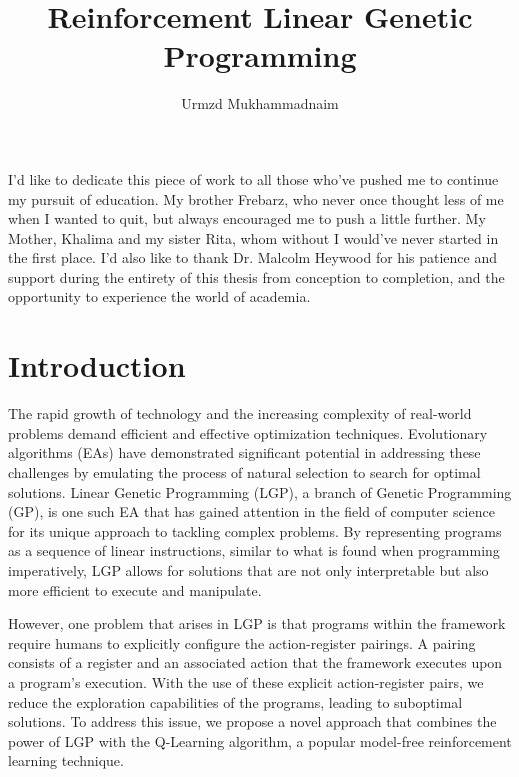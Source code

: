 \documentclass[12pt, final]{dalcsthesis}
\begin{document}
\bcshon
\title{Reinforcement Linear Genetic Programming}
\author{Urmzd Mukhammadnaim}

\reader{}

\nolistoftables
\nolistoffigures

\frontmatter

\nocite{*}

\begin{abstract}
\end{abstract}

\begin{acknowledgements}
    I'd like to dedicate this piece of work to all those who've pushed me to continue my
    pursuit of education. My brother Frebarz, who never once thought less of me when I wanted to 
    quit, but always encouraged me to push a little further. My Mother, Khalima and my sister Rita, whom without I would've never started in the first place. I'd also like to thank Dr. Malcolm Heywood for 
    his patience and support during the entirety of this thesis from conception to completion, and the opportunity to experience the world of academia.
\end{acknowledgements}

\mainmatter

\chapter{Introduction}
The rapid growth of technology and the increasing complexity of real-world problems demand efficient and effective optimization techniques. Evolutionary algorithms (EAs) have demonstrated significant potential in addressing these challenges by emulating the process of natural selection to search for optimal solutions. Linear Genetic Programming (LGP), a branch of Genetic Programming (GP), is one such EA that has gained attention in the field of computer science for its unique approach to tackling complex problems. By representing programs as a sequence of linear instructions, similar to what is found when programming imperatively, LGP allows for solutions that are not only interpretable but also more efficient to execute and manipulate.

However, one problem that arises in LGP is that programs within the framework require humans to explicitly configure the action-register pairings. A pairing consists of a register and an associated action that the framework executes upon a program's execution. With the use of these explicit action-register pairs, we reduce the exploration capabilities of the programs, leading to suboptimal solutions. To address this issue, we propose a novel approach that combines the power of LGP with the Q-Learning algorithm, a popular model-free reinforcement learning technique.
\end{document}
